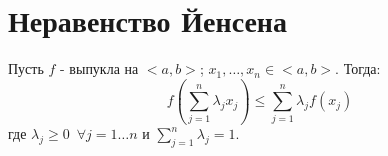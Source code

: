 \documentclass[11pt, a4paper, utf-8]{article}
\def\sp{\, \, \,}
\def\ds{\displaystyle}
\begin{document}
    \section{Неравенство Йенсена}
    Пусть $f$ - выпукла на $<a,b>$; $x_1, \ldots , x_n \in <a,b>$. Тогда:
    $$f\left(\sum_{j=1}^n \lambda_j x_j\right) \leq \sum_{j=1}^n \lambda_j f(x_j)$$
    где $\lambda_j \geq 0 \sp \forall j = 1\ldots n$ и $\ds \sum_{j = 1}^n \lambda_j = 1$.
\end{document}
